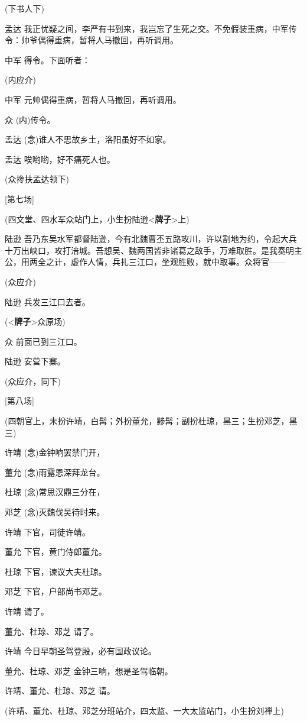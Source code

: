 (下书人下)

孟达
我正忧疑之间，李严有书到来，我岂忘了生死之交。不免假装重病，中军传令：帅爷偶得重病，暂将人马撤回，再听调用。

中军 得令。下面听者：

(内应介)

中军 元帅偶得重病，暂将人马撤回，再听调用。

众 (内)传令。

孟达 (念)谁人不思故乡土，洛阳虽好不如家。

孟达 唉哟哟，好不痛死人也。

(众搀扶孟达领下)

{[}第七场{]}

(四文堂、四水军众站门上，小生扮陆逊\textless{}\textbf{牌子}\textgreater{}上)

陆逊
吾乃东吴水军都督陆逊，今有北魏曹丕五路攻川，许以割地为约，令起大兵十万出峡口，攻打涪城。吾想吴、魏两国皆非诸葛之敌手，万难取胜。是我奏明主公，用两全之计，虚作人情，兵扎三江口，坐观胜败，就中取事。众将官------

(众应介)

陆逊 兵发三江口去者。

(\textless{}\textbf{牌子}\textgreater{}众原场)

众 前面已到三江口。

陆逊 安营下寨。

(众应介，同下)

{[}第八场{]}

(四朝官上，末扮许靖，白髯；外扮董允，黪髯；副扮杜琼，黑三；生扮邓芝，黑三)

许靖 (念)金钟响罢禁门开，

董允 (念)雨露恩深拜龙台。

杜琼 (念)常思汉鼎三分在，

邓芝 (念)灭魏伐吴待时来。

许靖 下官，司徒许靖。

董允 下官，黄门侍郎董允。

杜琼 下官，谏议大夫杜琼。

邓芝 下官，户部尚书邓芝。

许靖 请了。

董允、杜琼、邓芝 请了。

许靖 今日早朝圣驾登殿，必有国政议论。

董允、杜琼、邓芝 金钟三响，想是圣驾临朝。

许靖、董允、杜琼、邓芝 请。

(许靖、董允、杜琼、邓芝分班站介，四太监、一大太监站门，小生扮刘禅上)

